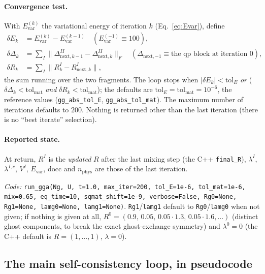 \documentclass[11pt]{article}
\begin{document}
\paragraph{Convergence test.} With $E^{(k)}_{\mathrm{var}}$ the variational
energy of iteration $k$ (Eq.~\eqref{eq:Evar}), define
\begin{align}
  \delta E_k &= E^{(k)}_{\mathrm{var}}-E^{(k-1)}_{\mathrm{var}}
     \quad(E^{(-1)}_{\mathrm{var}}\equiv100),\\
  \delta\Delta_k &= \sum_{I}\bigl\lVert\Delta^{II}_{\mathrm{next},k-1}-\Delta^{II}_{\mathrm{next},k}\bigr\rVert_F
     \quad(\Delta_{\mathrm{next},-1}\equiv\text{the qp block at iteration }0),\\
  \delta R_k &= \sum_{I}\bigl\lVert R^{I}_{k}-R^{I}_{\mathrm{next},k}\bigr\rVert ,
\end{align}
the sum running over the two fragments. The loop stops when
$\lvert\delta E_k\rvert<\mathrm{tol}_E$ \emph{or}
($\delta\Delta_k<\mathrm{tol}_{\mathrm{mat}}$ \emph{and}
$\delta R_k<\mathrm{tol}_{\mathrm{mat}}$); the defaults are
$\mathrm{tol}_E=\mathrm{tol}_{\mathrm{mat}}=10^{-6}$, the reference values
(\texttt{gg\_abs\_tol\_E}, \texttt{gg\_abs\_tol\_mat}). The maximum number of
iterations defaults to $200$. Nothing is returned other than the last
iteration (there is no ``best iterate'' selection).

\paragraph{Reported state.} At return, $R^I$ is the \emph{updated} $R$ after the
last mixing step (the C++ \texttt{final\_R}), $\lambda^I$, $\lambda^{I,c}$,
$V^I$, $E_{\mathrm{var}}$, $\mathrm{docc}$ and $n_{\mathrm{phys}}$ are those of
the last iteration.

\emph{Code:} \texttt{run\_gga(Ng, U, t=1.0, max\_iter=200, tol\_E=1e-6,
tol\_mat=1e-6, mix=0.65, eq\_time=10, sqmat\_shift=1e-9, verbose=False,
Rg0=None, Rg1=None, lamg0=None, lamg1=None)}. \texttt{Rg1}/\texttt{lamg1}
default to \texttt{Rg0}/\texttt{lamg0} when not given; if nothing is given at
all, $R^0=(0.9,\,0.05,\,0.05\cdot1.3,\,0.05\cdot1.6,\dots)$ (distinct ghost
components, to break the exact ghost-exchange symmetry) and $\lambda^0=0$
(the C++ default is $R=(1,\dots,1)$, $\lambda=0$).

\subsection{The main self-consistency loop, in pseudocode}
\label{sec:mixing-algo}
\end{document}
